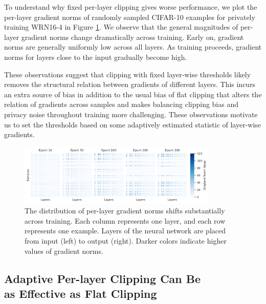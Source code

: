 To understand why fixed per-layer clipping gives worse performance, we plot the per-layer gradient norms of randomly sampled CIFAR-10 examples for privately training WRN16-4 in Figure \ref{fig:grad-norm-cifar10}.
We observe that the general magnitudes of per-layer gradient norms change dramatically across training. 
Early on, gradient norms are generally uniformly low across all layers. 
As training proceeds, gradient norms for layers close to the input gradually become high. 

These observations suggest that clipping with fixed layer-wise thresholds likely removes the structural relation between gradients of different layers. 
This incurs an extra source of bias in addition to the usual bias of flat clipping that alters the relation of gradients across samples and makes balancing clipping bias and privacy noise throughout training more challenging. 
These observations motivate us to set the thresholds based on some adaptively estimated statistic of layer-wise gradients. 

\begin{figure}[ht]
\centering
\includegraphics[width=0.85\textwidth]{files/fig/persample_perlayer_norm_cifar.pdf}
\caption{The distribution of per-layer gradient norms shifts substantially across training. Each column represents one layer, and each row represents one example. 
Layers of the neural network are placed from input (left) to output (right). 
Darker colors indicate higher values of gradient norms. 
}
\label{fig:grad-norm-cifar10}
\end{figure}

\subsection{Adaptive Per-layer Clipping Can Be \\as Effective as Flat Clipping}
\label{sec:adaptive-clipping}

